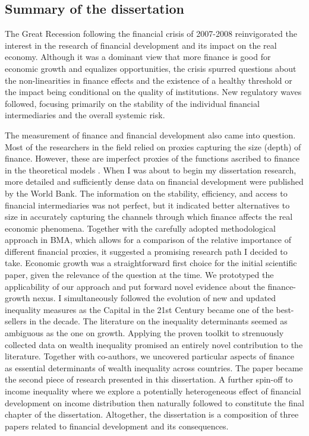\begin{refsection}
\chapter{Summary of the dissertation}
\label{ch1}
The Great Recession following the financial crisis of 2007-2008 reinvigorated the interest in the research of financial development and its impact on the real economy. Although it was a dominant view that more finance is good for economic growth and equalizes opportunities, the crisis spurred questions about the non-linearities in finance effects and the existence of a healthy threshold or the impact being conditional on the quality of institutions. New regulatory waves followed, focusing primarily on the stability of the individual financial intermediaries and the overall systemic risk. 

The measurement of finance and financial development also came into question. Most of the researchers in the field relied on proxies capturing the size (depth) of finance. However, these are imperfect proxies of the functions ascribed to finance in the theoretical models \parencite{Levine2005}. When I was about to begin my dissertation research, more detailed and sufficiently dense data on financial development were published by the World Bank. The information on the stability, efficiency, and access to financial intermediaries was not perfect, but it indicated better alternatives to size in accurately capturing the channels through which finance affects the real economic phenomena. Together with the carefully adopted methodological approach in BMA, which allows for a comparison of the relative importance of different financial proxies, it suggested a promising research path I decided to take. Economic growth was a straightforward first choice for the initial scientific paper, given the relevance of the question at the time. We prototyped the applicability of our approach and put forward novel evidence about the finance-growth nexus. I simultaneously followed the evolution of new and updated inequality measures as the Capital in the 21st Century \parencite{piketty2014} became one of the best-sellers in the decade. The literature on the inequality determinants seemed as ambiguous as the one on growth. Applying the proven toolkit to strenuously collected data on wealth inequality promised an entirely novel contribution to the literature. Together with co-authors, we uncovered particular aspects of finance as essential determinants of wealth inequality across countries. The paper became the second piece of research presented in this dissertation. A further spin-off to income inequality where we explore a potentially heterogeneous effect of financial development on income distribution then naturally followed to constitute the final chapter of the dissertation. Altogether, the dissertation is a composition of three papers related to financial development and its consequences. 


\end{refsection}
